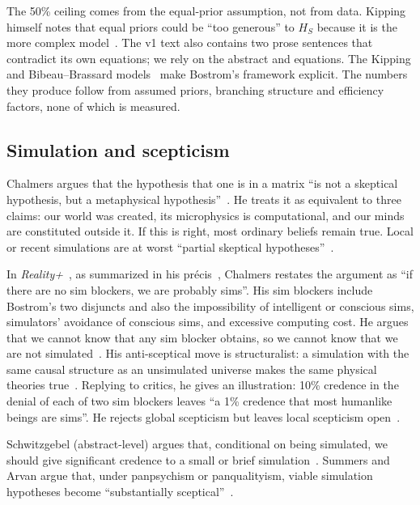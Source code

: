 The 50\% ceiling comes from the equal-prior assumption, not from data. Kipping himself
notes that equal priors could be ``too generous'' to $H_S$ because it is the more complex
model~\cite[\S\,3]{Kipping2020bayesian}. The v1 text also contains two prose sentences that
contradict its own equations; we rely on the abstract and equations. The
Kipping and Bibeau--Brassard models~\cite{Kipping2020bayesian,BibeauDelisle2021probability}
make Bostrom's framework explicit. The numbers they produce follow from assumed priors,
branching structure and efficiency factors, none of which is measured.

\subsection{Simulation and scepticism}
\label{sec:philosophy:scepticism}

Chalmers argues that the hypothesis that one is in a matrix ``is not a skeptical
hypothesis, but a metaphysical hypothesis''~\cite{Chalmers2005matrix}. He treats it as
equivalent to three claims: our world was created, its microphysics is computational, and
our minds are constituted outside it. If this is right, most ordinary beliefs remain true.
Local or recent simulations are at worst ``partial skeptical
hypotheses''~\cite{Chalmers2005matrix}.

In \emph{Reality+}~\cite{Chalmers2022reality}, as summarized in his
précis~\cite{Chalmers2024precis}, Chalmers restates the argument as ``if there are no sim
blockers, we are probably sims''. His sim blockers include Bostrom's two disjuncts and
also the impossibility of intelligent or conscious sims, simulators' avoidance of
conscious sims, and excessive computing cost. He argues that we cannot know that any sim
blocker obtains, so we cannot know that we are not simulated~\cite{Chalmers2024precis}.
His anti-sceptical move is structuralist: a simulation with the same causal structure as
an unsimulated universe makes the same physical theories true~\cite{Chalmers2024precis}.
Replying to critics, he gives an illustration: 10\% credence in the denial of each of two
sim blockers leaves ``a 1\% credence that most humanlike beings are sims''. He rejects
global scepticism but leaves local scepticism open~\cite{Chalmers2024taking}.

Schwitzgebel (abstract-level) argues that, conditional on being simulated, we should give
significant credence to a small or brief simulation~\cite{Schwitzgebel2024lets}.
Summers and Arvan argue that, under panpsychism or panqualityism, viable simulation
hypotheses become ``substantially sceptical''~\cite{Summers2022two}.


